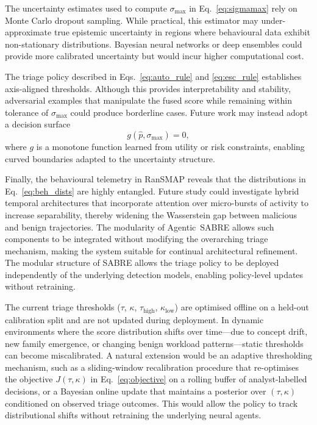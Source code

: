 \documentclass[3p]{elsarticle}
\begin{document}
The uncertainty estimates used to compute \(\sigma_{\max}\) in Eq.~\eqref{eq:sigmamax} rely on Monte Carlo dropout sampling. While practical, this estimator may under-approximate true epistemic uncertainty in regions where behavioural data exhibit non-stationary distributions. Bayesian neural networks or deep ensembles could provide more calibrated uncertainty but would incur higher computational cost.

The triage policy described in Eqs.~\eqref{eq:auto_rule} and \eqref{eq:esc_rule} establishes axis-aligned thresholds. Although this provides interpretability and stability, adversarial examples that manipulate the fused score while remaining within tolerance of \(\sigma_{\max}\) could produce borderline cases. Future work may instead adopt a decision surface
\begin{equation}
g(\hat{p},\sigma_{\max}) = 0,
\label{eq:nonlinear_boundary}
\end{equation}
where \(g\) is a monotone function learned from utility or risk constraints, enabling curved boundaries adapted to the uncertainty structure.

Finally, the behavioural telemetry in RanSMAP reveals that the distributions in Eq.~\eqref{eq:beh_dists} are highly entangled. Future study could investigate hybrid temporal architectures that incorporate attention over micro-bursts of activity to increase separability, thereby widening the Wasserstein gap between malicious and benign trajectories. The modularity of Agentic~SABRE allows such components to be integrated without modifying the overarching triage mechanism, making the system suitable for continual architectural refinement.
The modular structure of SABRE allows the triage policy to be deployed independently of the underlying detection models, enabling policy-level updates without retraining.

The current triage thresholds ($\tau$, $\kappa$, $\tau_{\text{high}}$, $\kappa_{\text{low}}$) are optimised offline on a held-out calibration split and are not updated during deployment. In dynamic environments where the score distribution shifts over time---due to concept drift, new family emergence, or changing benign workload patterns---static thresholds can become miscalibrated. A natural extension would be an adaptive thresholding mechanism, such as a sliding-window recalibration procedure that re-optimises the objective $J(\tau,\kappa)$ in Eq.~\ref{eq:objective} on a rolling buffer of analyst-labelled decisions, or a Bayesian online update that maintains a posterior over $(\tau, \kappa)$ conditioned on observed triage outcomes. This would allow the policy to track distributional shifts without retraining the underlying neural agents.
\end{document}
